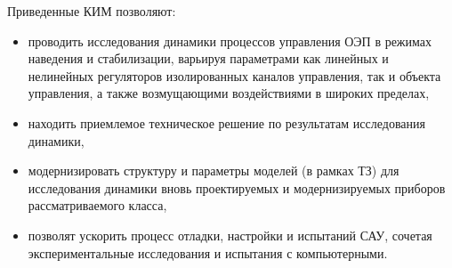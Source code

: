 \begin{enumerate}
	Приведенные КИМ позволяют:\par
	\begin{itemize}
		\item проводить исследования динамики процессов управления ОЭП в режимах наведения и стабилизации, варьируя параметрами как линейных и нелинейных регуляторов изолированных каналов управления, так и объекта управления, а также возмущающими воздействиями в широких пределах,
		\item находить приемлемое техническое решение по результатам исследования динамики,
		\item модернизировать структуру и параметры моделей (в рамках ТЗ) для исследования динамики вновь проектируемых и модернизируемых приборов рассматриваемого класса,
		\item позволят ускорить процесс отладки, настройки и испытаний САУ, сочетая экспериментальные исследования и испытания с компьютерными.
	\end{itemize}
	

\end{enumerate}
